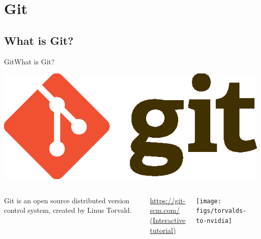 \documentclass[10pt,compress]{beamer} %
\begin{document}
\section{Git}

\subsection{What is Git?}

\begin{frame}{Git}{What is Git?}

\centering \includegraphics[width=.2\textwidth]{figs/Git-Logo-2Color.eps}

\begin{columns}
Git is an open source distributed version control system, created by Linus Torvald.

\url{https://git-scm.com/}
\\
\href{https://try.github.io/levels/1/challenges/1}{(Interactive tutorial)}


\begin{center}
 \texttt{[image: figs/torvalds-to-nvidia]}
\end{center}
\end{columns}

\end{frame}

\end{document}
